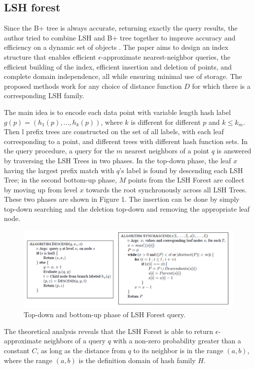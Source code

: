 \subsection{LSH forest}
Since the B+ tree is always accurate, returning exactly the query results, the author tried to combine LSH and B+ tree together to improve accuracy and efficiency on a dynamic set of objects \cite{bawa2005lsh}. The paper aims to design an index structure that enables efficient $\epsilon$-approximate nearest-neighbor queries, the efficient building of the index, efficient insertion and deletion of points, and complete domain independence, all while ensuring minimal use of storage. The proposed methods work for any choice of distance function $D$ for which there is a corresponding LSH family.

The main idea is to encode each data point with variable length hash label $g(p)=(h_1(p), ..., h_k(p))$, where $k$ is different for different $p$ and $k\leq k_m$. Then l prefix trees are constructed on the set of all labels, with each leaf corresponding to a point, and different trees with different hash function sets. In the query procedure, a query for the $m$ nearest neighbors of a point $q$ is answered by traversing the LSH Trees in two phases. In the top-down phase, the leaf $x$ having the largest prefix match with $q$'s label is found by descending each LSH Tree; in the second bottom-up phase, $M$ points from the LSH Forest are collect by moving up from level $x$ towards the root synchronously across all LSH Trees. These two phases are shown in Figure 1. The insertion can be done by simply top-down searching and the deletion top-down and removing the appropriate leaf node.
\begin{figure}
	\begin{center}
		\includegraphics[width=6in]{figures/1.png}
		\caption{Top-down and bottom-up phase of LSH Forest query.}
	\end{center}
\end{figure}

The theoretical analysis reveals that the LSH Forest is able to return $\epsilon$-approximate neighbors of a query $q$ with a non-zero probability greater than a constant $C$, as long as the distance from $q$ to its neighbor is in the range $(a,b)$, where the range $(a,b)$ is the definition domain of hash family $H$. 

